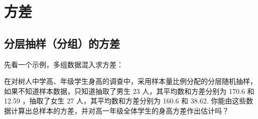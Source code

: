 \section{方差}

\subsection{分层抽样（分组）的方差}

先看一个示例，多组数据混入求方差：

\begin{example}
    在对树人中学高、年级学生身高的调查中，采用样本量比例分配的分层随机抽样，如果不知道样本数据，只知道抽取了男生 23 人，其平均数和方差分别为 170.6 和 12.59 ，抽取了女生 27 人，其平均数和方差分别为 160.6 和 38.62. 你能由这些数据计算出总样本的方差，并对高一年级全体学生的身高方差作出估计吗？
\end{example}

